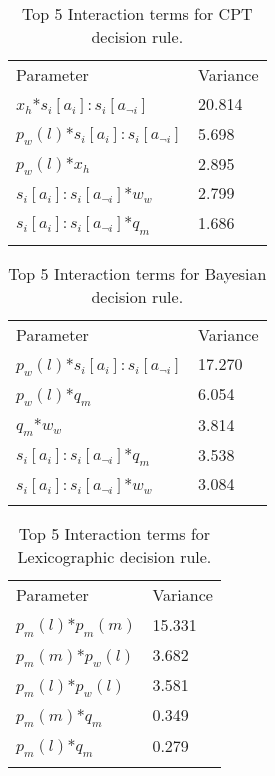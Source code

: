 \begin{table}[H]
\caption{Top 5 Interaction terms for \ac{CPT} decision rule. \label{tab:sa_interaction_prospect_sig}}
\begin{tabular} {ll}
\hline\noalign{\smallskip}
Parameter & Variance \\ 
\noalign{\smallskip}\svhline\noalign{\smallskip}

\(x_{h}\)*\(s_{i}[a_{i}]:s_{i}[a_{\neg i}]\) & 20.814\\
\(p_{w}(l)\)*\(s_{i}[a_{i}]:s_{i}[a_{\neg i}]\) & 5.698\\
\(p_{w}(l)\)*\(x_{h}\) & 2.895\\
\(s_{i}[a_{i}]:s_{i}[a_{\neg i}]\)*\(w_{w}\) & 2.799\\
\(s_{i}[a_{i}]:s_{i}[a_{\neg i}]\)*\(q_{m}\) & 1.686\\
\noalign{\smallskip}\hline\noalign{\smallskip}
\end{tabular}
\end{table}

\begin{table}[H]
\caption{Top 5 Interaction terms for Bayesian decision rule. \label{tab:sa_interaction_sharing_sig}}
\begin{tabular} {ll}
\hline\noalign{\smallskip}
Parameter & Variance \\
\noalign{\smallskip}\svhline\noalign{\smallskip}
\(p_{w}(l)\)*\(s_{i}[a_{i}]:s_{i}[a_{\neg i}]\) & 17.270\\
\(p_{w}(l)\)*\(q_{m}\) & 6.054\\
\(q_{m}\)*\(w_{w}\) & 3.814\\
\(s_{i}[a_{i}]:s_{i}[a_{\neg i}]\)*\(q_{m}\) & 3.538\\
\(s_{i}[a_{i}]:s_{i}[a_{\neg i}]\)*\(w_{w}\) & 3.084\\
\noalign{\smallskip}\hline\noalign{\smallskip}
\end{tabular}
\end{table}

\begin{table}[H]
\caption{Top 5 Interaction terms for Lexicographic decision rule. \label{tab:sa_interaction_lexic_sig}}
\begin{tabular} {ll}
\hline\noalign{\smallskip}
Parameter & Variance \\
\noalign{\smallskip}\svhline\noalign{\smallskip}
\(p_{m}(l)\)*\(p_{m}(m)\) & 15.331\\
\(p_{m}(m)\)*\(p_{w}(l)\) & 3.682\\
\(p_{m}(l)\)*\(p_{w}(l)\) & 3.581\\
\(p_{m}(m)\)*\(q_{m}\) & 0.349\\
\(p_{m}(l)\)*\(q_{m}\) & 0.279\\
\noalign{\smallskip}\hline\noalign{\smallskip}
\end{tabular}
\end{table}

